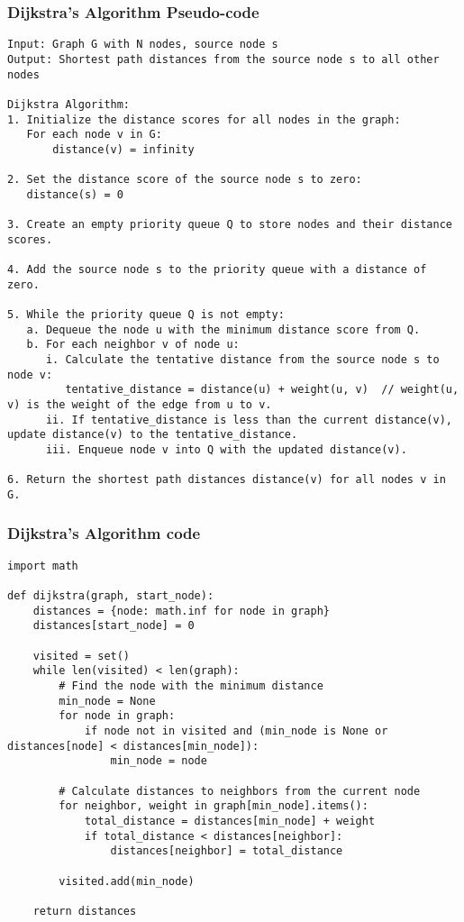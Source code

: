 \begin{frame}[fragile]\frametitle{Dijkstra's Algorithm Pseudo-code}

\begin{lstlisting}[basicstyle=\tiny]
Input: Graph G with N nodes, source node s
Output: Shortest path distances from the source node s to all other nodes

Dijkstra Algorithm:
1. Initialize the distance scores for all nodes in the graph:
   For each node v in G:
       distance(v) = infinity

2. Set the distance score of the source node s to zero:
   distance(s) = 0

3. Create an empty priority queue Q to store nodes and their distance scores.

4. Add the source node s to the priority queue with a distance of zero.

5. While the priority queue Q is not empty:
   a. Dequeue the node u with the minimum distance score from Q.
   b. For each neighbor v of node u:
      i. Calculate the tentative distance from the source node s to node v:
         tentative_distance = distance(u) + weight(u, v)  // weight(u, v) is the weight of the edge from u to v.
      ii. If tentative_distance is less than the current distance(v), update distance(v) to the tentative_distance.
      iii. Enqueue node v into Q with the updated distance(v).

6. Return the shortest path distances distance(v) for all nodes v in G.
\end{lstlisting}

\end{frame}

\begin{frame}[fragile]\frametitle{Dijkstra's Algorithm code}

\begin{lstlisting}[basicstyle=\tiny]
import math

def dijkstra(graph, start_node):
    distances = {node: math.inf for node in graph}
    distances[start_node] = 0

    visited = set()
    while len(visited) < len(graph):
        # Find the node with the minimum distance
        min_node = None
        for node in graph:
            if node not in visited and (min_node is None or distances[node] < distances[min_node]):
                min_node = node

        # Calculate distances to neighbors from the current node
        for neighbor, weight in graph[min_node].items():
            total_distance = distances[min_node] + weight
            if total_distance < distances[neighbor]:
                distances[neighbor] = total_distance

        visited.add(min_node)

    return distances
\end{lstlisting}

\end{frame}


